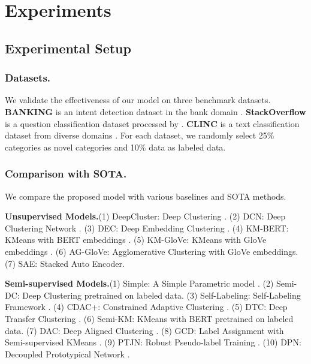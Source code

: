 \documentclass[letterpaper]{article} %
\begin{document}
\section{Experiments}
\subsection{Experimental Setup}
\subsubsection{Datasets.}
We validate the effectiveness of our model on three benchmark datasets.
\textbf{BANKING} is an intent detection dataset in the bank domain \citep{banking}.
\textbf{StackOverflow} is a question classification dataset processed by \citet{stack}.  
\textbf{CLINC} is a text classification dataset from diverse domains \citep{clinc}. For each dataset, we randomly select 25\% categories as novel categories and 10\% data as labeled data.

\subsubsection{Comparison with SOTA.}
We compare the proposed model with various baselines and SOTA methods.

\noindent \textbf{Unsupervised Models.}\quad  (1) DeepCluster: Deep Clustering \citep{deepcluster}. (2) DCN: Deep Clustering Network \citep{dcn}. (3) DEC: Deep Embedding Clustering \citep{dec}. (4) KM-BERT: KMeans with BERT embeddings \citep{bert}. (5) KM-GloVe: KMeans \citep{km} with GloVe embeddings \citep{glove}. (6) AG-GloVe: Agglomerative Clustering \citep{ag} with GloVe embeddings. (7) SAE: Stacked Auto Encoder.


\noindent \textbf{Semi-supervised Models.}\quad (1) Simple: A Simple Parametric model \citep{simple}. (2) Semi-DC: Deep Clustering \citep{deepcluster} pretrained on labeled data. (3) Self-Labeling: Self-Labeling Framework \citep{selflabel}. (4) CDAC+: Constrained Adaptive Clustering \citep{thu2020}. (5) DTC: Deep Transfer Clustering \citep{dtc}. (6) Semi-KM: KMeans with BERT pretrained on labeled data. (7) DAC: Deep Aligned Clustering \citep{thu2021}. (8) GCD: Label Assignment with Semi-supervised KMeans \citep{gcd}. (9) PTJN: Robust Pseudo-label Training \citep{ptjn}. (10) DPN: Decoupled Prototypical Network \citep{dpn}.
\end{document}

